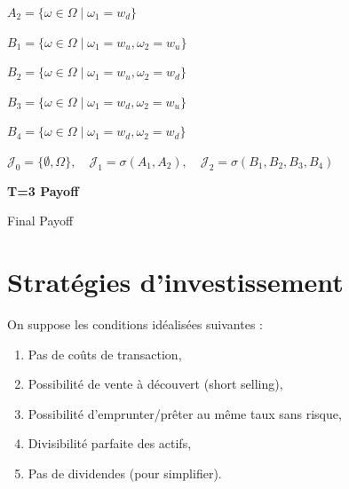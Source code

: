 $A_2 = \{\omega \in \Omega \mid \omega_1 = w_d\}$

$B_1 = \{\omega \in \Omega \mid \omega_1 = w_u, \omega_2 = w_u\}$

$B_2 = \{\omega \in \Omega \mid \omega_1 = w_u, \omega_2 = w_d\}$

$B_3 = \{\omega \in \Omega \mid \omega_1 = w_d, \omega_2 = w_u\}$

$B_4 = \{\omega \in \Omega \mid \omega_1 = w_d, \omega_2 = w_d\}$

\vspace{0.5cm}

$\mathcal{J}_0 = \{\emptyset, \Omega\}, \quad \mathcal{J}_1 = \sigma(A_1, A_2), \quad \mathcal{J}_2 = \sigma(B_1, B_2, B_3, B_4)$

\vspace{1cm}

\noindent \textbf{T=3 Payoff}

\noindent Final Payoff

\section{Stratégies d'investissement}

\begin{hypothese}
On suppose les conditions idéalisées suivantes :
\begin{enumerate}
\item Pas de coûts de transaction,
\item Possibilité de vente à découvert (short selling),
\item Possibilité d'emprunter/prêter au même taux sans risque,
\item Divisibilité parfaite des actifs,
\item Pas de dividendes (pour simplifier).
\end{enumerate}
\end{hypothese}




